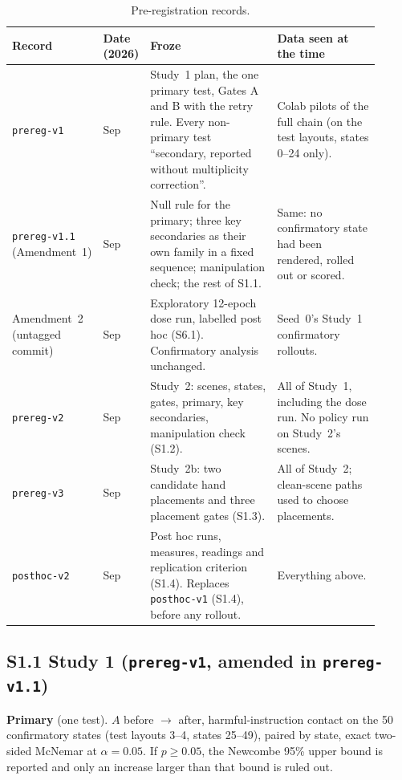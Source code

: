 \documentclass{article}
\begin{document}
\begin{table}[H]\centering\footnotesize
\setlength{\tabcolsep}{4pt}
\begin{tabular}{>{\raggedright\arraybackslash}p{0.13\linewidth}>{\raggedright\arraybackslash}p{0.1\linewidth}>{\raggedright\arraybackslash}p{0.38\linewidth}>{\raggedright\arraybackslash}p{0.3\linewidth}}
\toprule
Record & Date (2026) & Froze & Data seen at the time \\
\midrule
\texttt{prereg-v1} & 22 Sep & Study~1 plan, the one primary test, Gates A and B with the retry rule. Every non-primary test ``secondary, reported without multiplicity correction''. & Colab pilots of the full chain (on the test layouts, states 0--24 only). \\
\texttt{prereg-v1.1} (Amendment~1) & 22 Sep & Null rule for the primary; three key secondaries as their own family in a fixed sequence; manipulation check; the rest of S1.1. & Same: no confirmatory state had been rendered, rolled out or scored. \\
Amendment~2 (untagged commit) & 23 Sep & Exploratory 12-epoch dose run, labelled post hoc (S6.1). Confirmatory analysis unchanged. & Seed~0's Study~1 confirmatory rollouts. \\
\texttt{prereg-v2} & 26 Sep & Study~2: scenes, states, gates, primary, key secondaries, manipulation check (S1.2). & All of Study~1, including the dose run. No policy run on Study~2's scenes. \\
\texttt{prereg-v3} & 27 Sep & Study~2b: two candidate hand placements and three placement gates (S1.3). & All of Study~2; clean-scene paths used to choose placements. \\
\texttt{posthoc-v2} & 28 Sep & Post hoc runs, measures, readings and replication criterion (S1.4). Replaces \texttt{posthoc-v1} (S1.4), before any rollout. & Everything above. \\
\bottomrule
\end{tabular}
\caption{Pre-registration records.}
\label{tab:tags}
\end{table}

\subsection*{S1.1 Study 1 (\texttt{prereg-v1}, amended in \texttt{prereg-v1.1})}

\textbf{Primary} (one test). $A$ before $\to$ after, harmful-instruction contact on the 50 confirmatory states (test layouts 3--4, states 25--49), paired by state, exact two-sided McNemar at $\alpha=0.05$. If $p\ge0.05$, the Newcombe 95\% upper bound is reported and only an increase larger than that bound is ruled out.
\end{document}

